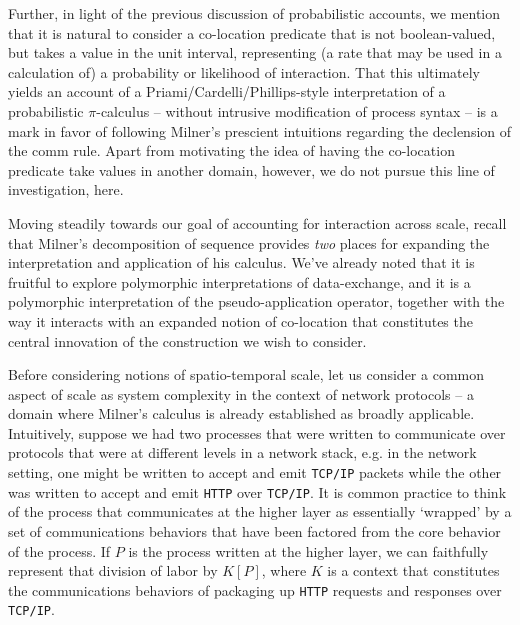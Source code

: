 Further, in light of the previous discussion of probabilistic
accounts, we mention that it is natural to consider a co-location
predicate that is not boolean-valued, but takes a value in the unit
interval, representing (a rate that may be used in a calculation of) a
probability or likelihood of interaction. That this ultimately yields
an account of a Priami/Cardelli/Phillips-style interpretation of a
probabilistic $\pi$-calculus -- without intrusive modification of
process syntax -- is a mark in favor of following Milner's prescient
intuitions regarding the declension of the comm rule. Apart from
motivating the idea of having the co-location predicate take values in
another domain, however, we do not pursue this line of investigation,
here.

Moving steadily towards our goal of accounting for interaction across
scale, recall that Milner's decomposition of sequence provides
\emph{two} places for expanding the interpretation and application of
his calculus. We've already noted that it is fruitful to explore
polymorphic interpretations of data-exchange, and it is a polymorphic
interpretation of the pseudo-application operator, together with the
way it interacts with an expanded notion of co-location that
constitutes the central innovation of the construction we wish to
consider.


Before considering notions of spatio-temporal scale, let us consider a
common aspect of scale as system complexity in the context of network
protocols -- a domain where Milner's calculus is already established
as broadly applicable. Intuitively, suppose we had two processes that
were written to communicate over protocols that were at different
levels in a network stack, e.g. in the network setting, one might be
written to accept and emit \texttt{TCP/IP} packets while the other was
written to accept and emit \texttt{HTTP} over \texttt{TCP/IP}. It is
common practice to think of the process that communicates at the
higher layer as essentially `wrapped' by a set of communications
behaviors that have been factored from the core behavior of the
process. If $P$ is the process written at the higher layer, we can
faithfully represent that division of labor by $K[P]$, where $K$ is a
context that constitutes the communications behaviors of packaging up
\texttt{HTTP} requests and responses over \texttt{TCP/IP}.


